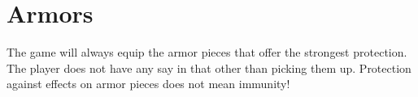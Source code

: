 \chapter{Armors}

The game will always equip the armor pieces that offer the strongest protection. The player does not have any say in that other than picking them up.
Protection against effects on armor pieces does not mean immunity!

\newpage

\newpage

\newpage

\newpage

\newpage

\newpage

\newpage

\newpage

\newpage

\newpage

\newpage

\newpage

